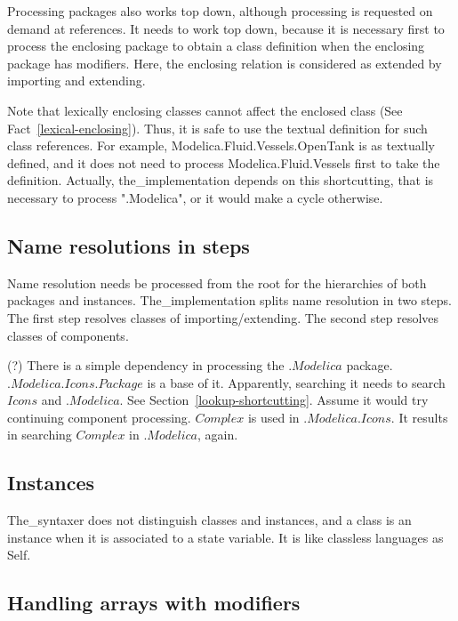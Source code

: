 \documentclass[10pt,b5paper]{article}
\begin{document}
Processing packages also works top down, although processing is
requested on demand at references.  It needs to work top down, because
it is necessary first to process the enclosing package to obtain a
class definition when the enclosing package has modifiers.  Here, the
enclosing relation is considered as extended by importing and
extending.

Note that lexically enclosing classes cannot affect the enclosed class
(See Fact~\ref{lexical-enclosing}).  Thus, it is safe to use the
textual definition for such class references.  For example,
Modelica.Fluid.Vessels.OpenTank is as textually defined, and it does
not need to process Modelica.Fluid.Vessels first to take the
definition.  Actually, the_implementation depends on this
shortcutting, that is necessary to process ".Modelica", or it would
make a cycle otherwise.

\subsection{Name resolutions in steps}

Name resolution needs be processed from the root for the hierarchies
of both packages and instances.  The_implementation splits name
resolution in two steps.  The first step resolves classes of
importing/extending.  The second step resolves classes of components.

(?) There is a simple dependency in processing the
$\mathit{.Modelica}$ package.  $\mathit{.Modelica.Icons.Package}$ is a
base of it.  Apparently, searching it needs to search $\mathit{Icons}$
and $\mathit{.Modelica}$.  See Section~\ref{lookup-shortcutting}.
Assume it would try continuing component processing.
$\mathit{Complex}$ is used in $\mathit{.Modelica.Icons}$.  It results
in searching $\mathit{Complex}$ in $\mathit{.Modelica}$, again.


\subsection{Instances}

The_syntaxer does not distinguish classes and instances, and a class
is an instance when it is associated to a state variable.  It is like
classless languages as Self.


\subsection{Handling arrays with modifiers}
\end{document}
